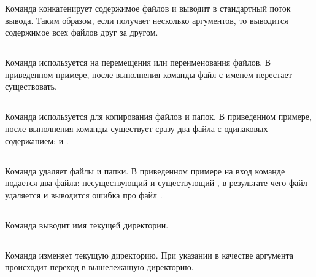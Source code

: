 Команда  конкатенирует содержимое файлов и выводит в стандартный поток вывода. Таким образом, если  получает несколько аргументов, то выводится содержимое всех файлов друг за другом. 


\subsection{}

Команда  используется на перемещения или переименования файлов. В приведенном примере, после выполнения команды  файл с именем  перестает существовать.


\subsection{}

Команда  используется для копирования файлов и папок. В приведенном примере, после выполнения команды  существует сразу два файла с одинаковых содержанием:  и .


\subsection{}

Команда  удаляет файлы и папки. В приведенном примере на вход команде  подается два файла: несуществующий  и существующий , в результате чего файл  удаляется и выводится ошибка про файл .


\subsection{}

Команда  выводит имя текущей директории.


\subsection{}

Команда  изменяет текущую директорию. При указании в качестве аргумента  происходит переход в вышележащую директорию.


